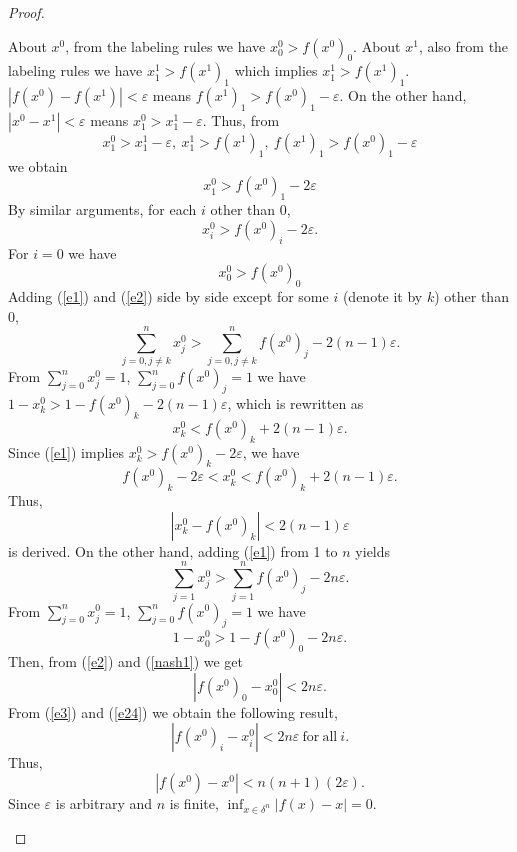 \documentclass[reqno]{amsart}
\begin{document}
\begin{proof}
\begin{enumerate}
About $x^0$, from the labeling rules we have $x^0_0>f(x^0)_0$. About $x^1$, also from the labeling rules we have $x^1_1>f(x^1)_1$ which implies $x^1_1>f(x^1)_1$. $|f(x^0)-f(x^1)|<\varepsilon$ means $f(x^1)_1>f(x^0)_1-\varepsilon$. On the other hand, $|x^0-x^1|<\varepsilon$ means $x^0_1>x^1_1-\varepsilon$. Thus, from
\[x^0_1>x^1_1-\varepsilon,\ x^1_1>f(x^1)_1,\ f(x^1)_1>f(x^0)_1-\varepsilon\]
we obtain
\[x^0_1>f(x^0)_1-2\varepsilon\]
By similar arguments, for each $i$ other than 0,
\begin{equation}
x^0_i>f(x^0)_i-2\varepsilon. \label{e1}
\end{equation}
For $i=0$ we have
\begin{equation}
x^0_0>f(x^0)_0 \label{e2}
\end{equation}
Adding (\ref{e1}) and (\ref{e2}) side by side except for some $i$ (denote it by $k$) other than 0,
\[\sum_{j=0, j\neq k}^{n} x^0_j>\sum_{j=0, j\neq k}^{n} f(x^0)_j-2(n-1)\varepsilon.\]
From $\sum_{j=0}^{n} x^0_j=1$, $\sum_{j=0}^{n} f(x^0)_j=1$ we have $1-x^0_k>1-f(x^0)_k-2(n-1)\varepsilon$, which is rewritten as
\[x^0_k<f(x^0)_k+2(n-1)\varepsilon.\]
Since (\ref{e1}) implies $x^0_k>f(x^0)_k-2\varepsilon$, we have
\[f(x^0)_k-2\varepsilon<x^0_k<f(x^0)_k+2(n-1)\varepsilon.\]
Thus,
\begin{equation}
|x^0_k-f(x^0)_k|<2(n-1)\varepsilon \label{e3}
\end{equation}
is derived. On the other hand, adding (\ref{e1}) from 1 to $n$ yields
\begin{equation*}
\sum_{j=1}^{n} x^0_j>\sum_{j=1}^{n} f(x^0)_j-2n\varepsilon.
\end{equation*}
From $\sum_{j=0}^{n} x^0_j=1$, $\sum_{j=0}^{n} f(x^0)_j=1$ we have
\begin{equation}
1-x^0_0>1-f(x^0)_0-2n\varepsilon.\label{nash1}
\end{equation}
Then, from (\ref{e2}) and (\ref{nash1}) we get
\begin{equation}
|f(x^0)_0-x^0_0|<2n\varepsilon. \label{e24}
\end{equation}
From (\ref{e3}) and (\ref{e24}) we obtain the following result,
\begin{equation*}
|f(x^0)_i-x^0_i|<2n\varepsilon\ \mathrm{for\ all}\ i. %
\end{equation*}
Thus,
\begin{equation}
|f(x^0)-x^0|<n(n+1)(2\varepsilon).\label{fp}
\end{equation}
Since $\varepsilon$ is arbitrary and $n$ is finite, $\inf_{x\in \delta^n}|f(x)-x|=0$.%


\end{enumerate}
\end{proof}
\end{document}
